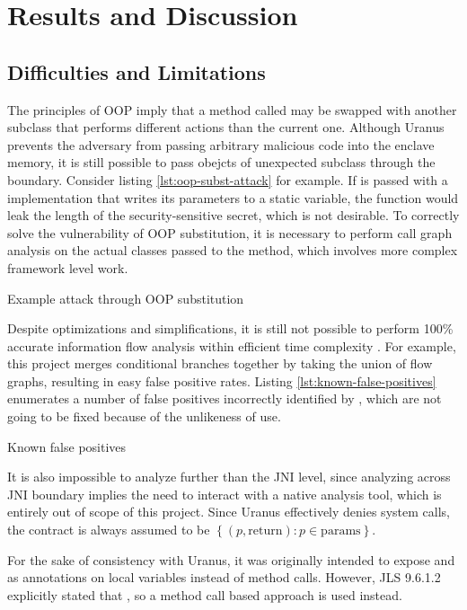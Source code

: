 \section{Results and Discussion}
\subsection{Difficulties and Limitations}
The principles of OOP imply that a method called may be swapped with another subclass
that performs different actions than the current one.
Although Uranus prevents the adversary
from passing arbitrary malicious code into the enclave memory,
it is still possible to pass obejcts of unexpected subclass
through the  boundary.
Consider listing \ref{lst:oop-subst-attack} for example.
If  is passed with a  implementation
that writes its parameters to a static variable,
the function would leak the length of the security-sensitive secret,
which is not desirable.
To correctly solve the vulnerability of OOP substitution,
it is necessary to perform call graph analysis on the actual classes passed to the method,
which involves more complex framework level work.

{Example attack through OOP substitution}

Despite optimizations and simplifications,
it is still not possible to perform 100\% accurate information flow analysis
within efficient time complexity \cite{SmithGeoffrey2007PoSI}.
For example, this project merges conditional branches together
by taking the union of flow graphs,
resulting in easy false positive rates.
Listing \ref{lst:known-false-positives} enumerates a number of false positives
incorrectly identified by \pname{},
which are not going to be fixed because of the unlikeness of use.

{Known false positives}

It is also impossible to analyze further than the JNI level,
since analyzing across JNI boundary implies
the need to interact with a native analysis tool,
which is entirely out of scope of this project.
Since Uranus effectively denies system calls,
the contract is always assumed to be $\left\{ (p, \text{return}) : p \in \text{params} \right\}$.

For the sake of consistency with Uranus,
it was originally intended to expose  and 
as annotations on local variables instead of method calls.
However, JLS 9.6.1.2 explicitly stated that
 \cite{jls},
so a method call based approach is used instead.

